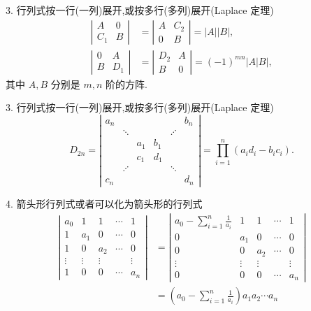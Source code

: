 \documentclass[13pt,fontset=mac]{ctexbeamer}
\begin{document}
\begin{frame}{3. 行列式按一行(一列)展开,或按多行(多列)展开(Laplace 定理)}
\begin{align*}
\left|\begin{array}{cc}
		A & 0 \\
		C_{1} & B
	\end{array}\right| & =\left|\begin{array}{cc}
		A & C_{2} \\
		0 & B
	\end{array}\right|=|A||B|,\\
\left|\begin{array}{cc}
		0 & A \\
		B & D_{1}
	\end{array}\right| & =\left|\begin{array}{cc}
		D_{2} & A \\
		B & 0
	\end{array}\right|=(-1)^{m n}|A| B \mid, 
\end{align*}
 { 其中 } $A, B$  { 分别是 } $m,  n$  { 阶的方阵. }
\end{frame}


\begin{frame}{3. 行列式按一行(一列)展开,或按多行(多列)展开(Laplace 定理)}
$$
D_{2 n}=
\left|\begin{array}{cccccc}
	a_{n} & & & & & b_{n} \\
	& \ddots & & & \iddots & \\
	& & a_{1} & b_{1} & & \\
	& & c_{1} & d_{1} & & \\
	&  \iddots  & & & \ddots & \\
	c_{n} & & & &  & d_{n}
\end{array}\right|
=\prod_{i=1}^{n}\left(a_{i} d_{i}-b_{i} c_{i}\right) .
$$
\end{frame}


\begin{frame}{4. 箭头形行列式或者可以化为箭头形的行列式}
\begin{align*}
\left|\begin{array}{ccccc}
	a_{0} & 1 & 1 & \cdots & 1 \\
	1 & a_{1} & 0 & \cdots & 0 \\
	1 & 0 & a_{2} & \cdots & 0 \\
	\vdots & \vdots & \vdots & & \vdots \\
	1 & 0 & 0 & \cdots & a_{n}
\end{array}\right|
& =\left|\begin{array}{ccccc}
	a_{0}-\sum_{i=1}^{n} \frac{1}{a_{i}} & 1 & 1 & \cdots & 1 \\
	0 & a_{1} & 0 & \cdots & 0 \\
	0 & 0 & a_{2} & \cdots & 0 \\
	\vdots & \vdots & \vdots & & \vdots \\
	0 & 0 & 0 & \cdots & a_{n}
\end{array}\right|\\[6pt]
& =\left(a_{0}-\sum_{i=1}^{n} \frac{1}{a_{i}}\right) a_{1} a_{2} \cdots a_{n}
\end{align*}
\end{frame}
\end{document}
